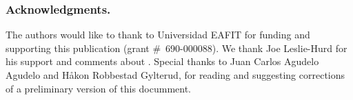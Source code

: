 \documentclass[../paper.tex]{subfiles}
\begin{document}

\subsubsection*{Acknowledgments.}

The authors would like to thank to Universidad EAFIT for funding and
supporting this publication (grant \#~690-000088). We thank Joe
Leslie-Hurd for his support and comments about \Metis. 
Special thanks to Juan Carlos Agudelo Agudelo and Håkon Robbestad
Gylterud, for reading and suggesting corrections of a preliminary
version of this documment.
\end{document}
